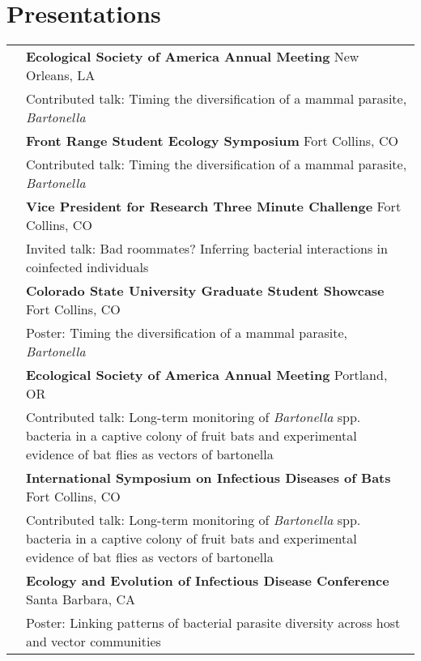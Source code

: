 \documentclass[letterpaper]{deedy-resume} %
\begin{document}

\section{Presentations}
\begin{tabular}{>{\raggedright\arraybackslash}p{2cm}p{16cm}}

2018 & \textbf{Ecological Society of America Annual Meeting} New Orleans, LA\\
	& Contributed talk: Timing the diversification of a mammal parasite, \textit{Bartonella}\\
	
2018 & \textbf{Front Range Student Ecology Symposium} Fort Collins, CO\\
	& Contributed talk: Timing the diversification of a mammal parasite, \textit{Bartonella}\\

2018 & \textbf{Vice President for Research Three Minute Challenge} Fort Collins, CO\\
	& \textcolor{special}{Invited talk}: Bad roommates? Inferring bacterial interactions in coinfected individuals\\

2017 & \textbf{Colorado State University Graduate Student Showcase} Fort Collins, CO\\
	& Poster: Timing the diversification of a mammal parasite, \textit{Bartonella}\\
	
2017 & \textbf{Ecological Society of America Annual Meeting} Portland, OR\\
	& Contributed talk: Long-term monitoring of \textit{Bartonella} spp. bacteria in a captive colony of fruit bats and experimental evidence of bat flies as vectors of bartonella\\
	
2017 & \textbf{International Symposium on Infectious Diseases of Bats} Fort Collins, CO\\
	& Contributed talk: Long-term monitoring of \textit{Bartonella} spp. bacteria in a captive colony of fruit bats and experimental evidence of bat flies as vectors of bartonella\\
	
2017 & \textbf{Ecology and Evolution of Infectious Disease Conference} Santa Barbara, CA\\
	& Poster: Linking patterns of bacterial parasite diversity across host and vector communities\\

\end{tabular}
\end{document}
